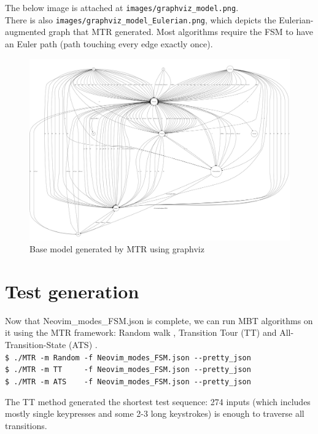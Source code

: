\documentclass[12pt]{article}
\begin{document}
		The below image is attached at \verb|images/graphviz_model.png|.\\There is also \verb|images/graphviz_model_Eulerian.png|, which depicts the Eulerian-augmented graph that MTR generated. Most algorithms require the FSM to have an Euler path (path touching every edge exactly once).

		\begin{figure}[h]
			\centering
			\includegraphics[width=1.0\textwidth]{images/graphviz_model.png}
			\caption{Base model generated by MTR using graphviz}
		\end{figure}

	\section{Test generation}

		Now that Neovim\_modes\_FSM.json is complete, we can run MBT algorithms on it using the MTR framework: Random walk \cite{random}, Transition Tour (TT) \cite{tt} and All-Transition-State (ATS) \cite{ats}.\\

		{\parindent0pt
		\verb|$ ./MTR -m Random -f Neovim_modes_FSM.json --pretty_json|\\
		\verb|$ ./MTR -m TT     -f Neovim_modes_FSM.json --pretty_json|\\
		\verb|$ ./MTR -m ATS    -f Neovim_modes_FSM.json --pretty_json|\\
		}

		The TT method generated the shortest test sequence: 274 inputs (which includes mostly single keypresses and some 2-3 long keystrokes) is enough to traverse all transitions.
\end{document}
